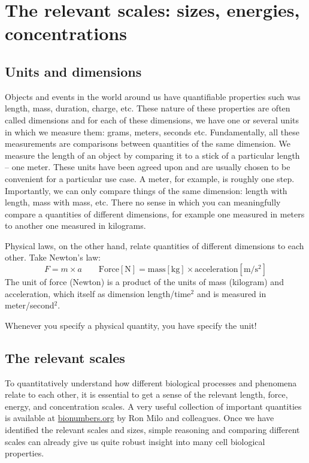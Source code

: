 \chapter{The relevant scales: sizes, energies, concentrations}

\section{Units and dimensions}
Objects and events in the world around us have quantifiable properties such was length, mass, duration, charge, etc.
These nature of these properties are often called dimensions and for each of these dimensions, we have one or several units in which we measure them: grams, meters, seconds etc.
Fundamentally, all these measurements are comparisons between quantities of the same dimension.
We measure the length of an object by comparing it to a stick of a particular length -- one meter.
These units have been agreed upon and are usually chosen to be convenient for a particular use case.
A meter, for example, is roughly one step.
Importantly, we can only compare things of the same dimension: length with length, mass with mass, etc.
There no sense in which you can meaningfully compare a quantities of different dimensions, for example one measured in meters to another one measured in kilograms.

Physical laws, on the other hand, relate quantities of different dimensions to each other.
Take Newton's law:
\begin{equation}
	F = m\times a \quad\quad \mathrm{Force [N]} = \mathrm{mass [kg]}\times \mathrm{acceleration [m/s^2]}
\end{equation}
The unit of force (Newton) is a product of the units of mass (kilogram) and acceleration, which itself as dimension length/time$^2$ and is measured in meter/second$^2$.

Whenever you specify a physical quantity, you have specify the unit!

\section{The relevant scales}
To quantitatively understand how different biological processes and phenomena relate to each other, it is essential to get a sense of the relevant length, force, energy, and concentration scales.
A very useful collection of important quantities is available at \href{http://book.bionumbers.org}{bionumbers.org} by Ron Milo and colleagues.
Once we have identified the relevant scales and sizes, simple reasoning and comparing different scales can already give us quite robust insight into many cell biological properties.

